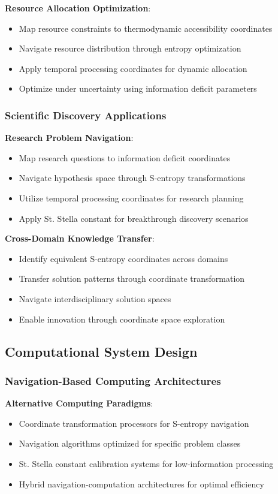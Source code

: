 \documentclass[11pt]{article}
\begin{document}
\textbf{Resource Allocation Optimization}:
\begin{itemize}
\item Map resource constraints to thermodynamic accessibility coordinates
\item Navigate resource distribution through entropy optimization
\item Apply temporal processing coordinates for dynamic allocation
\item Optimize under uncertainty using information deficit parameters
\end{itemize}

\subsubsection{Scientific Discovery Applications}

\textbf{Research Problem Navigation}:
\begin{itemize}
\item Map research questions to information deficit coordinates
\item Navigate hypothesis space through S-entropy transformations
\item Utilize temporal processing coordinates for research planning
\item Apply St. Stella constant for breakthrough discovery scenarios
\end{itemize}

\textbf{Cross-Domain Knowledge Transfer}:
\begin{itemize}
\item Identify equivalent S-entropy coordinates across domains
\item Transfer solution patterns through coordinate transformation
\item Navigate interdisciplinary solution spaces
\item Enable innovation through coordinate space exploration
\end{itemize}

\subsection{Computational System Design}

\subsubsection{Navigation-Based Computing Architectures}

\textbf{Alternative Computing Paradigms}:
\begin{itemize}
\item Coordinate transformation processors for S-entropy navigation
\item Navigation algorithms optimized for specific problem classes
\item St. Stella constant calibration systems for low-information processing
\item Hybrid navigation-computation architectures for optimal efficiency
\end{itemize}
\end{document}
